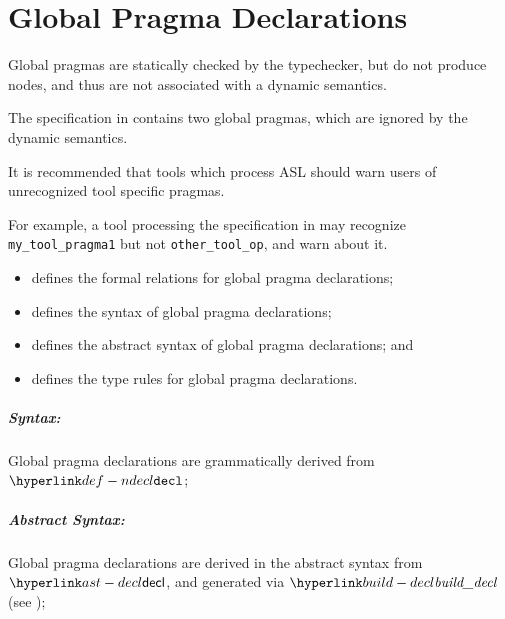 \chapter{Global Pragma Declarations\label{chap:Global Pragma Declarations}}

Global pragmas are statically checked by the typechecker, but do not produce \typedast{} nodes,
and thus are not associated with a dynamic semantics.

The specification in  contains two global pragmas,
which are ignored by the dynamic semantics.

It is recommended that tools which process ASL should warn users of unrecognized tool specific pragmas.

For example, a tool processing the specification in  may recognize \\
\verb|my_tool_pragma1| but not \verb|other_tool_op|, and warn about it.

\ChapterOutline
\begin{itemize}
    \item {} defines the formal relations for global pragma declarations;
    \item {} defines the syntax of global pragma declarations;
    \item {} defines the abstract syntax of global pragma declarations; and
    \item {} defines the type rules for global pragma declarations.
\end{itemize}


\paragraph{Syntax:} Global pragma declarations are grammatically derived from $\Ndecl$;

\paragraph{Abstract Syntax:} Global pragma declarations are derived in the abstract syntax from $\decl$,
    and generated via $\builddecl$ (see );

